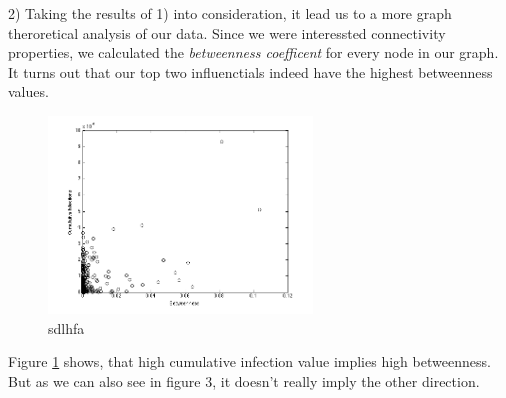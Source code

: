 2) Taking the results of 1) into consideration, it lead us to a more graph theroretical analysis of our data. Since we were interessted connectivity properties, we calculated the \textit{betweenness coefficent} for every node in our graph. 
It turns out that our top two influenctials indeed have the highest betweenness values. 

\begin{figure}
\includegraphics[width=7cm]{influ4}
\caption{sdlhfa}
\label{Betweenness}
\end{figure}

Figure \ref{Betweenness} shows, that high cumulative infection value implies high betweenness. But as we can also see in figure 3, it doesn't really imply the other direction.





